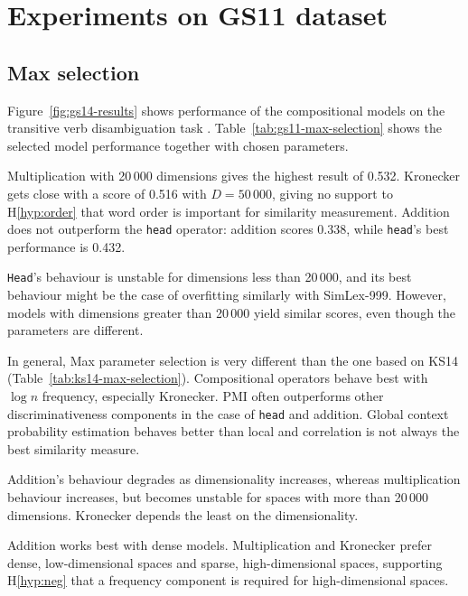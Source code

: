 \section{Experiments on GS11 dataset}
\label{sec:gs11}

\subsection{Max selection}
\label{sec:max-selection-gs11}



Figure~\ref{fig:gs14-results} shows performance of the compositional models on the transitive verb disambiguation task \cite{Grefenstette:2011:ESC:2145432.2145580}. Table~\ref{tab:gs11-max-selection} shows the selected model performance together with chosen parameters.

Multiplication with 20\,000 dimensions gives the highest result of 0.532. Kronecker gets close with a score of 0.516 with $D = 50\,000$, giving no support to H\ref{hyp:order} that word order is important for similarity measurement. Addition does not outperform the \texttt{head} operator: addition scores 0.338, while \texttt{head}'s best performance is 0.432.

\texttt{Head}'s behaviour is unstable for dimensions less than 20\,000, and its best behaviour might be the case of overfitting similarly with SimLex-999. However, models with dimensions greater than 20\,000 yield similar scores, even though the parameters are different.

In general, Max parameter selection is very different than the one based on KS14 (Table~\ref{tab:ks14-max-selection}). Compositional operators behave best with $\log n$ frequency, especially Kronecker. PMI often outperforms other discriminativeness components in the case of \texttt{head} and addition. Global context probability estimation behaves better than local and correlation is not always the best similarity measure.

Addition's behaviour degrades as dimensionality increases, whereas multiplication behaviour increases, but becomes unstable for spaces with more than 20\,000 dimensions. Kronecker depends the least on the dimensionality.

Addition works best with dense models. Multiplication and Kronecker prefer dense, low-dimensional spaces and sparse, high-dimensional spaces, supporting H\ref{hyp:neg} that a frequency component is required for high-dimensional spaces.

